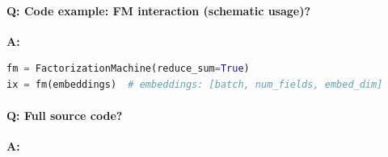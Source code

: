 \documentclass[11pt]{article}
\begin{document}
\paragraph{Q: Code example: FM interaction (schematic usage)?}
\textbf{A:}
\begin{lstlisting}[language=Python]
fm = FactorizationMachine(reduce_sum=True)
ix = fm(embeddings)  # embeddings: [batch, num_fields, embed_dim]
\end{lstlisting}

\paragraph{Q: Full source code?}
\textbf{A:}

\end{document}
